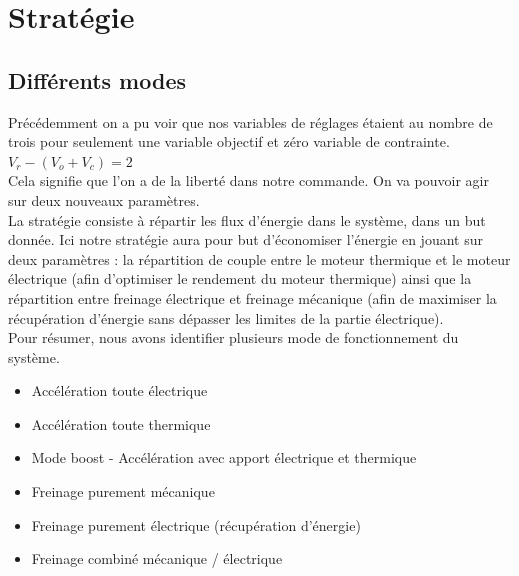 \section{Stratégie}
\subsection{Différents modes}
Précédemment on a pu voir que nos variables de réglages étaient au nombre de trois pour seulement une variable objectif et zéro variable de contrainte.\\
$V_r - (V_o + V_c) = 2$ \\
Cela signifie que l'on a de la liberté dans notre commande. On va pouvoir agir sur deux nouveaux paramètres.\\

La stratégie consiste à répartir les flux d'énergie dans le système, dans un but donnée. Ici notre stratégie aura pour but d'économiser l'énergie en jouant sur deux paramètres : la répartition de couple entre le moteur thermique et le moteur électrique (afin d'optimiser le rendement du moteur thermique) ainsi que la répartition entre freinage électrique et freinage mécanique (afin de maximiser la récupération d'énergie sans dépasser les limites de la partie électrique).\\

Pour résumer, nous avons identifier plusieurs mode de fonctionnement du système.\\
\begin{itemize}
\item Accélération toute électrique
\item Accélération toute thermique
\item Mode boost - Accélération avec apport électrique et thermique
\item Freinage purement mécanique
\item Freinage purement électrique (récupération d'énergie)
\item Freinage combiné mécanique / électrique
\end{itemize}~\\

